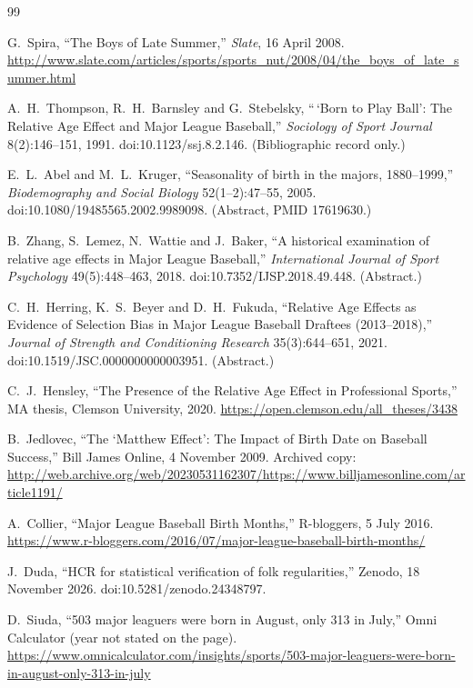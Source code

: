 \documentclass[11pt]{article}
\begin{document}
\begin{thebibliography}{99}

 G.~Spira, ``The Boys of Late Summer,'' \emph{Slate}, 16 April 2008. \url{http://www.slate.com/articles/sports/sports_nut/2008/04/the_boys_of_late_summer.html}

 A.~H.~Thompson, R.~H.~Barnsley and G.~Stebelsky, ``\,`Born to Play Ball': The Relative Age Effect and Major League Baseball,'' \emph{Sociology of Sport Journal} 8(2):146--151, 1991. doi:10.1123/ssj.8.2.146. (Bibliographic record only.)

 E.~L.~Abel and M.~L.~Kruger, ``Seasonality of birth in the majors, 1880--1999,'' \emph{Biodemography and Social Biology} 52(1--2):47--55, 2005. doi:10.1080/19485565.2002.9989098. (Abstract, PMID 17619630.)

 B.~Zhang, S.~Lemez, N.~Wattie and J.~Baker, ``A historical examination of relative age effects in Major League Baseball,'' \emph{International Journal of Sport Psychology} 49(5):448--463, 2018. doi:10.7352/IJSP.2018.49.448. (Abstract.)

 C.~H.~Herring, K.~S.~Beyer and D.~H.~Fukuda, ``Relative Age Effects as Evidence of Selection Bias in Major League Baseball Draftees (2013--2018),'' \emph{Journal of Strength and Conditioning Research} 35(3):644--651, 2021. doi:10.1519/JSC.0000000000003951. (Abstract.)

 C.~J.~Hensley, ``The Presence of the Relative Age Effect in Professional Sports,'' MA thesis, Clemson University, 2020. \url{https://open.clemson.edu/all_theses/3438}

 B.~Jedlovec, ``The `Matthew Effect': The Impact of Birth Date on Baseball Success,'' Bill James Online, 4 November 2009. Archived copy: \url{http://web.archive.org/web/20230531162307/https://www.billjamesonline.com/article1191/}

 A.~Collier, ``Major League Baseball Birth Months,'' R-bloggers, 5 July 2016. \url{https://www.r-bloggers.com/2016/07/major-league-baseball-birth-months/}

 J.~Duda, ``HCR for statistical verification of folk regularities,'' Zenodo, 18 November 2026. doi:10.5281/zenodo.24348797.

 D.~Siuda, ``503 major leaguers were born in August, only 313 in July,'' Omni Calculator (year not stated on the page). \url{https://www.omnicalculator.com/insights/sports/503-major-leaguers-were-born-in-august-only-313-in-july}


\end{thebibliography}
\end{document}
